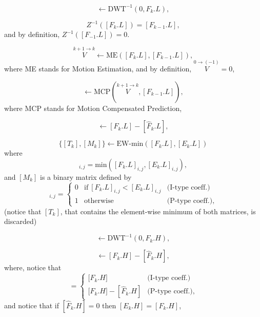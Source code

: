\begin{equation}
  [F_k.L] \leftarrow \text{DWT}^{-1}(0, F_k.L),
  \tag{b}
\end{equation}

\begin{equation}
  Z^{-1}([F_k.L]) = [F_{k-1}.L],
  \tag{c}
\end{equation}
and by definition, $Z^{-1}([F_{-1}.L]) = 0$.

\begin{equation}
  \overset{k+1\rightarrow k}{V} \leftarrow \text{ME}([F_k.L], [F_{k-1}.L]),
  \tag{d}
\end{equation}
where ME stands for Motion Estimation, and by definition,
$\overset{0\rightarrow (-1)}{V}=0$,

\begin{equation}
  [\hat{F}_k.L] \leftarrow \text{MCP}(\overset{k+1\rightarrow k}{V}, [F_{k-1}.L]),
  \tag{e}
\end{equation}
where MCP stands for Motion Compensated Prediction,

\begin{equation}
  [E_k.L] \leftarrow [F_k.L] - [\hat{F}_k.L],
  \tag{f}
\end{equation}

\begin{equation}
  \{[T_k],[M_k]\} \leftarrow \text{EW-min}([F_k.L], [E_k.L])
  \tag{g}
\end{equation}
where
\begin{equation}
  [T_k]_{i,j}=\text{min}([F_k.L]_{i,j}, [E_k.L]_{i,j}),
\end{equation}
and $[M_k]$ is a binary matrix defined by
\begin{equation}
  [M_k]_{i,j} = \left\{
  \begin{array}{lll}
    0 & \text{if}~[F_k.L]_{i,j} < [E_k.L]_{i,j} & \text{(I-type coeff.)} \\
    1 & \text{otherwise}                      & \text{(P-type coeff.)},
  \end{array}
  \right.
  \label{eq:matrix}
\end{equation}
(notice that $[T_k]$, that contains the element-wise minimum of both
matrices, is discarded)

\begin{equation}
  [F_k.H] \leftarrow \text{DWT}^{-1}(0, F_k.H),
  \tag{h}
\end{equation}

\begin{equation}
  [E_k.H] \leftarrow [F_k.H] - [\hat{F}_k.H],
  \tag{i}
\end{equation}
where, notice that
\begin{equation}
  [E_k.H] = \left\{
  \begin{array}{ll}
    {[}F_k.H{]}                 & \text{(I-type coeff.)}\\
    {[}F_k.H{]} - [\hat{F}_k.H] & \text{(P-type coeff.)},
  \end{array}
  \right.
\end{equation}
and notice that if $[\hat{F}_k.H]=0$ then $[E_k.H] = [F_k.H]$,

